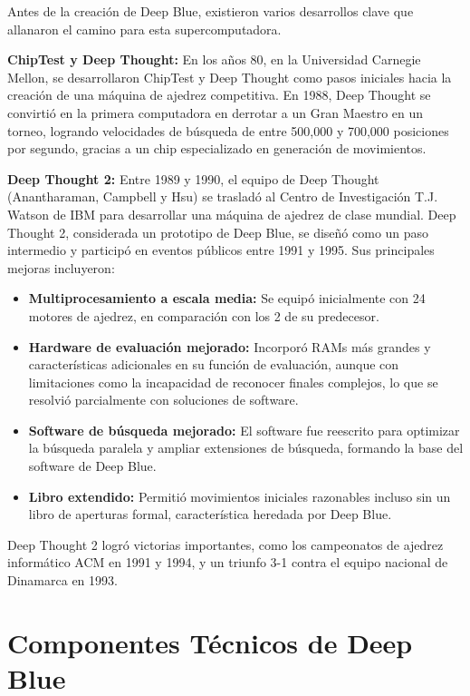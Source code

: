 \documentclass[12pt,a4paper]{article}
\begin{document}
Antes de la creación de Deep Blue, existieron varios desarrollos clave que allanaron el camino para esta supercomputadora.

\textbf{ChipTest y Deep Thought:} En los años 80, en la Universidad Carnegie Mellon, se desarrollaron ChipTest y Deep Thought como pasos iniciales hacia la creación de una máquina de ajedrez competitiva. En 1988, Deep Thought se convirtió en la primera computadora en derrotar a un Gran Maestro en un torneo, logrando velocidades de búsqueda de entre 500,000 y 700,000 posiciones por segundo, gracias a un chip especializado en generación de movimientos.

\textbf{Deep Thought 2:} Entre 1989 y 1990, el equipo de Deep Thought (Anantharaman, Campbell y Hsu) se trasladó al Centro de Investigación T.J. Watson de IBM para desarrollar una máquina de ajedrez de clase mundial. Deep Thought 2, considerada un prototipo de Deep Blue, se diseñó como un paso intermedio y participó en eventos públicos entre 1991 y 1995. Sus principales mejoras incluyeron:  
\begin{itemize}
    \item \textbf{Multiprocesamiento a escala media:} Se equipó inicialmente con 24 motores de ajedrez, en comparación con los 2 de su predecesor.
    \item \textbf{Hardware de evaluación mejorado:} Incorporó RAMs más grandes y características adicionales en su función de evaluación, aunque con limitaciones como la incapacidad de reconocer finales complejos, lo que se resolvió parcialmente con soluciones de software.
    \item \textbf{Software de búsqueda mejorado:} El software fue reescrito para optimizar la búsqueda paralela y ampliar extensiones de búsqueda, formando la base del software de Deep Blue.
    \item \textbf{Libro extendido:} Permitió movimientos iniciales razonables incluso sin un libro de aperturas formal, característica heredada por Deep Blue.
\end{itemize}

Deep Thought 2 logró victorias importantes, como los campeonatos de ajedrez informático ACM en 1991 y 1994, y un triunfo 3-1 contra el equipo nacional de Dinamarca en 1993.

\newpage

\section{Componentes Técnicos de Deep Blue}
\end{document}
